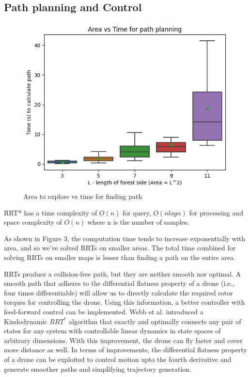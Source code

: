 \subsection{Path planning and Control}

\begin{figure}[h]
\centering
\includegraphics[scale=0.5]{images/time_area.png}
\caption{Area to explore vs time for finding path}
\end{figure}


RRT* has a time complexity of $O(n)$ for query, $O(nlogn)$ for processing and space complexity of $O(n)$ where n is the number of samples.

As shown in Figure 3, the computation time tends to increase exponentially with area, and so we've solved RRTs on smaller areas.
The total time combined for solving RRTs on smaller maps is lesser than finding a path on the entire area.

RRTs produce a collision-free path, but they are neither smooth nor optimal.
A smooth path that adheres to the differential flatness property of a drone (i.e., four times differentiable) will allow us to directly calculate the required rotor torques for controlling the drone.
Using this information, a better controller with feed-forward control can be implemented.
Webb et al. introduced a Kindodynamic $RRT^*$ algorithm that exactly and optimally connects any pair of states for any system with controllable linear dynamics in state spaces of arbitrary dimensions\cite{DBLP:journals/corr/abs-1205-5088}.
With this improvement, the drone can fly faster and cover more distance as well.
In terms of improvements, the differential flatness property of a drone can be exploited to control motion upto the fourth derivative and generate smoother paths and simplifying trajectory generation.

